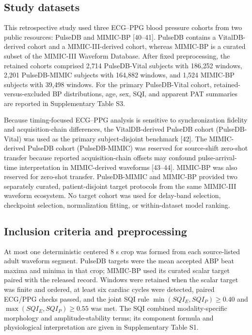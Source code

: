 \documentclass[preprint,12pt]{elsarticle}
\begin{document}
\subsection{Study datasets}

This retrospective study used three ECG--PPG blood pressure cohorts from two public resources: PulseDB and MIMIC-BP [40--41]. PulseDB contains a VitalDB-derived cohort and a MIMIC-III-derived cohort, whereas MIMIC-BP is a curated subset of the MIMIC-III Waveform Database. After fixed preprocessing, the retained cohorts comprised 2{,}714 PulseDB-Vital subjects with 186{,}252 windows, 2{,}201 PulseDB-MIMIC subjects with 164{,}882 windows, and 1{,}524 MIMIC-BP subjects with 39{,}498 windows. For the primary PulseDB-Vital cohort, retained-versus-excluded BP distributions, age, sex, SQI, and apparent PAT summaries are reported in Supplementary Table S3.

Because timing-focused ECG--PPG analysis is sensitive to synchronization fidelity and acquisition-chain differences, the VitalDB-derived PulseDB cohort (PulseDB-Vital) was used as the primary subject-disjoint benchmark [42]. The MIMIC-derived PulseDB cohort (PulseDB-MIMIC) was reserved for source-shift zero-shot transfer because reported acquisition-chain offsets may confound pulse-arrival-time interpretation in MIMIC-derived waveforms [43--44]. MIMIC-BP was also reserved for zero-shot transfer. PulseDB-MIMIC and MIMIC-BP provided two separately curated, patient-disjoint target protocols from the same MIMIC-III waveform ecosystem. No target cohort was used for delay-band selection, checkpoint selection, normalization fitting, or within-dataset model ranking.

\subsection{Inclusion criteria and preprocessing}

At most one deterministic centered 8 s crop was formed from each source-listed adult waveform segment. PulseDB targets were the mean accepted ABP beat maxima and minima in that crop; MIMIC-BP used its curated scalar target paired with the released record. Windows were retained when the scalar target was finite and ordered, at least six cardiac cycles were detected, paired ECG/PPG checks passed, and the joint SQI rule $\min(SQI_E,SQI_P)\geq0.40$ and $\max(SQI_E,SQI_P)\geq0.55$ was met.  The SQI combined modality-specific morphology and amplitude-stability terms; its component formula and physiological interpretation are given in Supplementary Table S1.
\end{document}
